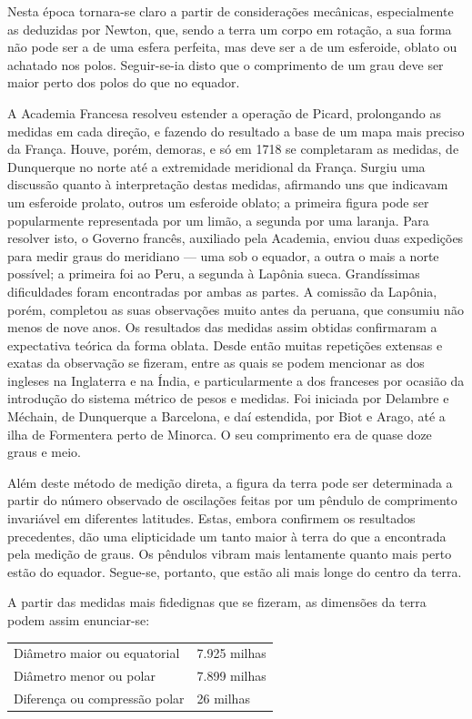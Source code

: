 \documentclass[11pt,a5paper,twoside,openany]{book}
\begin{document}
Nesta época tornara-se claro a partir de considerações mecânicas, especialmente as deduzidas por Newton, que, sendo a terra um corpo em rotação, a sua forma não pode ser a de uma esfera perfeita, mas deve ser a de um esferoide, oblato ou achatado nos polos. Seguir-se-ia disto que o comprimento de um grau deve ser maior perto dos polos do que no equador.

A Academia Francesa resolveu estender a operação de Picard, prolongando as medidas em cada direção, e fazendo do resultado a base de um mapa mais preciso da França. Houve, porém, demoras, e só em 1718 se completaram as medidas, de Dunquerque no norte até a extremidade meridional da França. Surgiu uma discussão quanto à interpretação destas medidas, afirmando uns que indicavam um esferoide prolato, outros um esferoide oblato; a primeira figura pode ser popularmente representada por um limão, a segunda por uma laranja. Para resolver isto, o Governo francês, auxiliado pela Academia, enviou duas expedições para medir graus do meridiano — uma sob o equador, a outra o mais a norte possível; a primeira foi ao Peru, a segunda à Lapônia sueca. Grandíssimas dificuldades foram encontradas por ambas as partes. A comissão da Lapônia, porém, completou as suas observações muito antes da peruana, que consumiu não menos de nove anos. Os resultados das medidas assim obtidas confirmaram a expectativa teórica da forma oblata. Desde então muitas repetições extensas e exatas da observação se fizeram, entre as quais se podem mencionar as dos ingleses na Inglaterra e na Índia, e particularmente a dos franceses por ocasião da introdução do sistema métrico de pesos e medidas. Foi iniciada por Delambre e Méchain, de Dunquerque a Barcelona, e daí estendida, por Biot e Arago, até a ilha de Formentera perto de Minorca. O seu comprimento era de quase doze graus e meio.

Além deste método de medição direta, a figura da terra pode ser determinada a partir do número observado de oscilações feitas por um pêndulo de comprimento invariável em diferentes latitudes. Estas, embora confirmem os resultados precedentes, dão uma elipticidade um tanto maior à terra do que a encontrada pela medição de graus. Os pêndulos vibram mais lentamente quanto mais perto estão do equador. Segue-se, portanto, que estão ali mais longe do centro da terra.

A partir das medidas mais fidedignas que se fizeram, as dimensões da terra podem assim enunciar-se:

\begin{longtable}{p{} | p{}}
 &  \\
\hline
Diâmetro maior ou equatorial & 7.925 milhas \\
Diâmetro menor ou polar & 7.899 milhas \\
Diferença ou compressão polar & 26 milhas \\
\end{longtable}
\end{document}
